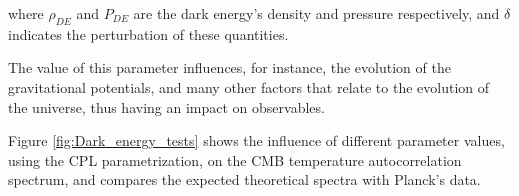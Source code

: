 \documentclass[openany,a4paper,12pt,oneside]{book}
\begin{document}
\begin{spacing}{1.5}
\noindent where $\rho_{DE}$ and $P_{DE}$ are the dark energy's density and pressure respectively, and $\delta$ indicates the perturbation of these quantities. 

The value of this parameter influences, for instance, the evolution of the gravitational potentials\cite{DE_variable_soundspeed_Linton2018}, and many other factors that relate to the evolution of the universe, thus having an impact on observables. 

Figure \ref{fig:Dark_energy_tests} shows the influence of different parameter values, using the CPL parametrization, on the CMB temperature autocorrelation spectrum, and compares the expected theoretical spectra with Planck's data.


\begin{figure}
	\centering
\end{figure}
\end{spacing}
\end{document}
